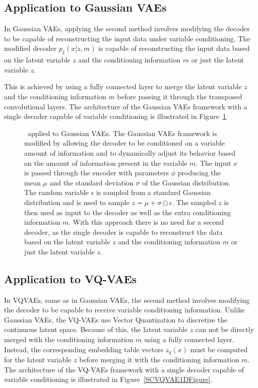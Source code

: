 \subsection{Application to Gaussian VAEs}

In Gaussian VAEs, applying the second method involves modifying the decoder to be capable of reconstructing the input data under variable conditioning. The modified decoder $p_\xi(x|z,m)$ is capable of reconstructing the input data based on the latent variable $z$ and the conditioning information $m$ or just the latent variable $z$.

This is achieved by using a fully connected layer to merge the latent variable $z$ and the conditioning information $m$ before passing it through the transposed convolutional layers. The architecture of the Gaussian VAEs framework with a single decoder capable of variable conditioning is illustrated in Figure~\ref{SCVAE1DFigure}.



\begin{figure}[H]
    \centering
    
    \caption[ applied to Gaussian VAEs.]%
    {
        \methodTwo\ applied to Gaussian VAEs. The Gaussian VAEs framework is modified by allowing the decoder to be conditioned on a variable amount of information and to dynamically adjust its behavior based on the amount of information present in the variable $m$. The input $x$ is passed through the encoder with parameters $\phi$ producing the mean $\mu$ and the standard deviation $\sigma$ of the Gaussian distribution. The random variable $\epsilon$ is sampled from a standard Gaussian distribution and is used to sample $ z = \mu + \sigma \odot \epsilon$. The sampled $z$ is then used as input to the decoder as well as the extra conditioning information $m$. With this approach there is no need for a second decoder, as the single decoder is capable to reconstruct the data based on the latent variable $z$ and the conditioning information $m$ or just the latent variable $z$.
    }\label{SCVAE1DFigure}
\end{figure}

\subsection{Application to VQ-VAEs}

In VQVAEs, same as in Gaussian VAEs, the second method involves modifying the decoder to be capable to receive variable conditioning information. Unlike Gaussian VAEs, the VQ-VAEs use Vector Quantization to discretize the continuous latent space. Because of this, the latent variable $z$ can not be directly merged with the conditioning information $m$ using a fully connected layer. Instead, the corresponding embedding table vectors $z_q(x)$ must be computed for the latent variable $z$ before merging it with the conditioning information $m$. The architecture of the VQ-VAEs framework with a single decoder capable of variable conditioning is illustrated in Figure~\ref{SCVQVAE1DFigure}.

